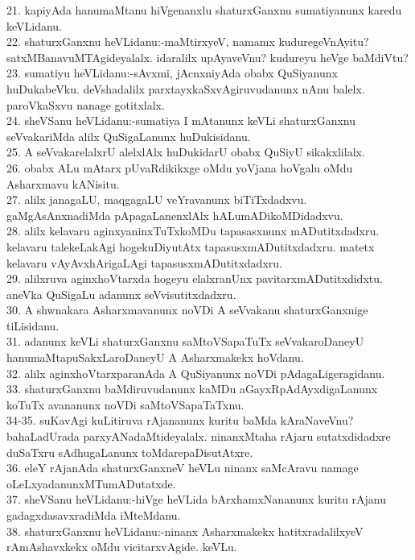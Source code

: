 \documentclass{article}
\begin{document}
21. kapiyAda hanumaMtanu hiVgenanxlu shaturxGanxnu sumatiyanunx karedu keVLidanu.\\
22. shaturxGanxnu heVLidanu:-maMtirxyeV, namamx kuduregeVnAyitu? satxMBanavuMTAgideyalalx. idaralilx upAyaveVnu? kudureyu heVge baMdiVtu?\\
23. sumatiyu heVLidanu:-sAvxmi, jAcnxniyAda obabx QuSiyanunx huDukabeVku. deVshadalilx parxtayxkaSxvAgiruvudanunx nAnu balelx. paroVkaSxvu nanage gotitxlalx.\\
24. sheVSanu heVLidanu:-sumatiya I mAtanunx keVLi shaturxGanxnu seVvakariMda alilx QuSigaLanunx huDukisidanu.\\
25. A seVvakarelalxrU alelxlAlx huDukidarU obabx QuSiyU sikakxlilalx.\\
26. obabx ALu mAtarx pUvaRdikikxge oMdu yoVjana hoVgalu oMdu Asharxmavu kANisitu.\\
27. alilx janagaLU, maqgagaLU veYravanunx biTiTxdadxvu. gaMgAsAnxnadiMda pApagaLanenxlAlx hALumADikoMDidadxvu.\\
28. alilx kelavaru aginxyaninxTuTxkoMDu tapasasxnunx mADutitxdadxru. kelavaru talekeLakAgi hogekuDiyutAtx tapasusxmADutitxdadxru. matetx kelavaru vAyAvxhArigaLAgi tapasusxmADutitxdadxru.\\
29. alilxruva aginxhoVtarxda hogeyu elalxranUnx pavitarxmADutitxdidxtu. aneVka QuSigaLu adanunx seVvisutitxdadxru.\\
30. A shwnakara Asharxmavanunx noVDi A seVvakanu shaturxGanxnige tiLisidanu.\\
31. adanunx keVLi shaturxGanxnu saMtoVSapaTuTx seVvakaroDaneyU hanumaMtapuSakxLaroDaneyU A Asharxmakekx hoVdanu.\\
32. alilx aginxhoVtarxparanAda A QuSiyanunx noVDi pAdagaLigeragidanu.\\
33. shaturxGanxnu baMdiruvudanunx kaMDu aGayxRpAdAyxdigaLanunx koTuTx avananunx noVDi saMtoVSapaTaTxnu.\\
34-35. suKavAgi kuLitiruva rAjananunx kuritu baMda kAraNaveVnu? bahaLadUrada parxyANadaMtideyalalx. ninanxMtaha rAjaru sutatxdidadxre duSaTxru sAdhugaLanunx toMdarepaDisutAtxre.\\
36. eleY rAjanAda shaturxGanxneV heVLu ninanx saMcAravu namage oLeLxyadanunxMTumADutatxde.\\
37. sheVSanu heVLidanu:-hiVge heVLida bArxhamxNananunx kuritu rAjanu gadagxdasavxradiMda iMteMdanu.\\
38. shaturxGanxnu heVLidanu:-ninanx Asharxmakekx hatitxradalilxyeV rAmAshavxkekx oMdu vicitarxvAgide. keVLu.\\
\end{document}
